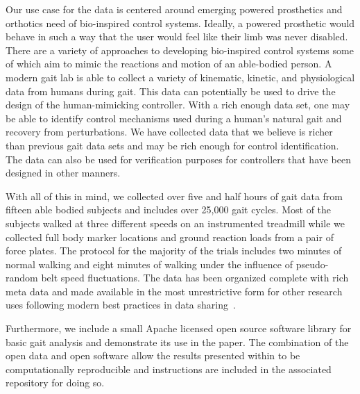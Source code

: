 \documentclass[10pt,a4paper,twocolumn]{article}
\begin{document}
Our use case for the data is centered around emerging powered prosthetics and
orthotics need of bio-inspired control systems. Ideally, a powered prosthetic
would behave in such a way that the user would feel like their limb was never
disabled. There are a variety of approaches to developing bio-inspired control
systems some of which aim to mimic the reactions and motion of an able-bodied
person. A modern gait lab is able to collect a variety of kinematic, kinetic,
and physiological data from humans during gait. This data can potentially be
used to drive the design of the human-mimicking controller. With a rich enough
data set, one may be able to identify control mechanisms used during a human's
natural gait and recovery from perturbations. We have collected data that we
believe is richer than previous gait data sets and may be rich enough for
control identification.  The data can also be used for verification purposes
for controllers that have been designed in other manners.

With all of this in mind, we collected over five and half hours of gait data
from fifteen able bodied subjects and includes over 25,000 gait cycles. Most of
the subjects walked at three different speeds on an instrumented treadmill
while we collected full body marker locations and ground reaction loads from a
pair of force plates. The protocol for the majority of the trials includes two
minutes of normal walking and eight minutes of walking under the influence of
pseudo-random belt speed fluctuations. The data has been organized complete with
rich meta data and made available in the most unrestrictive form for other
research uses following modern best practices in data sharing~\cite{White2013}.

Furthermore, we include a small Apache licensed open source software library
for basic gait analysis and demonstrate its use in the paper. The combination
of the open data and open software allow the results presented within to be
computationally reproducible and instructions are included in the associated
repository for doing so.
\end{document}
